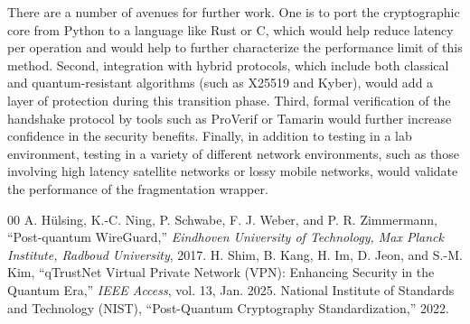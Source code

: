 \documentclass[10pt, conference, letterpaper]{IEEEtran}
\begin{document}
There are a number of avenues for further work. One is to port the cryptographic core from Python to a language like Rust or C, which would help reduce latency per operation and would help to further characterize the performance limit of this method. Second, integration with hybrid protocols, which include both classical and quantum-resistant algorithms (such as X25519 and Kyber), would add a layer of protection during this transition phase. Third, formal verification of the handshake protocol by tools such as ProVerif or Tamarin would further increase confidence in the security benefits. Finally, in addition to testing in a lab environment, testing in a variety of different network environments, such as those involving high latency satellite networks or lossy mobile networks, would validate the performance of the fragmentation wrapper.

\begin{thebibliography}{00}
 A. H\"ulsing, K.-C. Ning, P. Schwabe, F. J. Weber, and P. R. Zimmermann, ``Post-quantum WireGuard,'' \textit{Eindhoven University of Technology, Max Planck Institute, Radboud University}, 2017.
 H. Shim, B. Kang, H. Im, D. Jeon, and S.-M. Kim, ``qTrustNet Virtual Private Network (VPN): Enhancing Security in the Quantum Era,'' \textit{IEEE Access}, vol. 13, Jan. 2025. 
 National Institute of Standards and Technology (NIST), ``Post-Quantum Cryptography Standardization,'' 2022.
\end{thebibliography}
\end{document}
